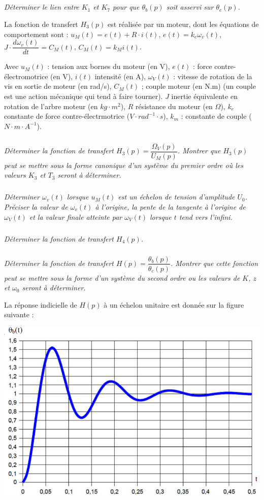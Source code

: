 \documentclass[10pt,fleqn]{article} %
\begin{document}
\begin{multicols}{2}
\subparagraph{}
\textit{Déterminer le lien entre $K_1$ et $K_7$ pour que $\theta_b(p)$ soit asservi sur $\theta_c(p)$.}

La fonction de transfert $H_3(p)$ est réalisée par un moteur, dont les équations de comportement sont :
$u_M(t)=e(t)+R\cdot i(t)$, $e(t)=k_e\omega_v(t)$, $J\cdot \dfrac{d\omega_v(t)}{dt}=C_M(t)$, $C_M(t)=k_M i(t)$.


Avec $u_M(t)$ : tension aux bornes du moteur (en V), $e(t)$ : force contre-électromotrice (en V), $i(t)$ intensité (en A), $\omega_V(t)$ : vitesse de rotation de la vis en sortie de moteur (en rad/s), $C_M(t)$ ; couple moteur (en N.m) (un couple est une action mécanique qui tend à faire tourner). $J$ inertie équivalente en rotation de l'arbre moteur (en $kg\cdot m^2$), $R$ résistance du moteur (en $\Omega$), $k_e$ constante de force contre-électrmotrice ($V\cdot rad^{-1}\cdot s$), $k_m$ : constante de couple ($N\cdot m\cdot A^{-1}$).

\subparagraph{}
\textit{Déterminer la fonction de transfert $H_3(p)=\dfrac{\Omega_V(p)}{U_M(p)}$. Montrer que $H_3(p)$ peut se mettre sous la forme canonique d'un système du premier ordre où les valeurs $K_3$ et $T_3$ seront à déterminer.}

\subparagraph{}
\textit{Déterminer $\omega_v(t)$ lorsque $u_M(t)$ est un échelon de tension d'amplitude $U_0$. Préciser la valeur de $\omega_v(t)$ à l'origine, la pente de la tangente à l'origine de $\omega_V(t)$ et la valeur finale atteinte par $\omega_V(t)$ lorsque $t$ tend vers l'infini.}

\subparagraph{}
\textit{Déterminer la fonction de transfert $H_4(p)$. }

\subparagraph{}
\textit{Déterminer la fonction de transfert $H(p)=\dfrac{\theta_b(p)}{\theta_c(p)}$. Montrer que cette fonction peut se mettre sous la forme d'un système du second ordre ou les valeurs de $K$, $z$ et $\omega_0$ seront à déterminer.}

La réponse indicielle de $H(p)$ à un échelon unitaire est donnée sur la figure suivante :

\begin{center}
\includegraphics[width=\linewidth]{images/fig_4}
\end{center}


\end{multicols}
\end{document}
